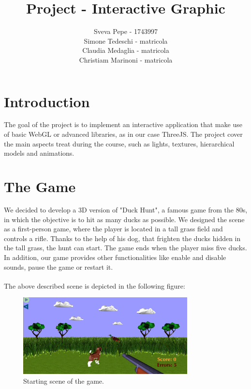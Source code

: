 \documentclass{article}
\title{Project - Interactive Graphic}
\author{Sveva Pepe - 1743997 \\ 
        Simone Tedeschi - matricola \\
        Claudia Medaglia - matricola \\
        Christiam Marinoni - matricola}
\date{}
\begin{document}
\maketitle
\section{Introduction}
The goal of the project is to implement an interactive application 
that make use of basic WebGL or advanced libraries, as in our case ThreeJS. The project 
cover the main aspects treat during the course, such as 
lights, textures, hierarchical models and animations.
\section{The Game}
We decided to develop a 3D version of "Duck Hunt", a  
famous game from the 80s, in which the objective is to hit  
as many ducks as possible. We designed the
scene as a first-person game, where the player is located 
in a tall grass field and controls a rifle. 
Thanks to the help of his dog, that frighten the ducks hidden 
in the tall grass, the hunt can start. 
The game ends when the player miss five ducks.
In addition, our game provides other functionalities like enable 
and disable sounds, pause the game or restart it.
\\ \\The above described scene is depicted in the following figure:
\begin{figure}[hbt!]
    \centering
    \includegraphics[width=0.8\textwidth]{game.png}
    \caption{Starting scene of the game.}
    \label{fig1}
\end{figure}
\end{document}
